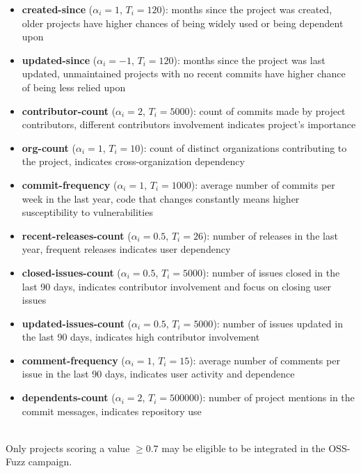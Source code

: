 \begin{itemize}
    \item \textbf{created-since} ($\alpha_i = 1$, $T_i = 120$): months since the project was created, older projects have higher chances of being widely used or being dependent upon
    \item \textbf{updated-since} ($\alpha_i = -1$, $T_i = 120$): months since the project was last updated, unmaintained projects with no recent commits have higher chance of being less relied upon
    \item \textbf{contributor-count} ($\alpha_i = 2$, $T_i = 5000$): count of commits made by project contributors, different contributors involvement indicates project's importance
    \item \textbf{org-count} ($\alpha_i = 1$, $T_i = 10$): count of distinct organizations contributing to the project, indicates cross-organization dependency
    \item \textbf{commit-frequency} ($\alpha_i = 1$, $T_i = 1000$): average number of commits per week in the last year, code that changes constantly means higher susceptibility to vulnerabilities
    \item \textbf{recent-releases-count} ($\alpha_i = 0.5$, $T_i = 26$): number of releases in the last year, frequent releases indicates user dependency
    \item \textbf{closed-issues-count} ($\alpha_i = 0.5$, $T_i = 5000$): number of issues closed in the last 90 days, indicates contributor involvement and focus on closing user issues
    \item \textbf{updated-issues-count} ($\alpha_i = 0.5$, $T_i = 5000$): number of issues updated in the last 90 days, indicates high contributor involvement
    \item \textbf{comment-frequency} ($\alpha_i = 1$, $T_i = 15$): average number of comments per issue in the last 90 days, indicates  user activity and dependence
    \item \textbf{dependents-count} ($\alpha_i = 2$, $T_i = 500000$): number of project mentions in the commit messages, indicates repository use
\end{itemize}
\ \\
Only projects scoring a value $\geq 0.7$ may be eligible to be integrated in the OSS-Fuzz campaign.
\newline \newline



